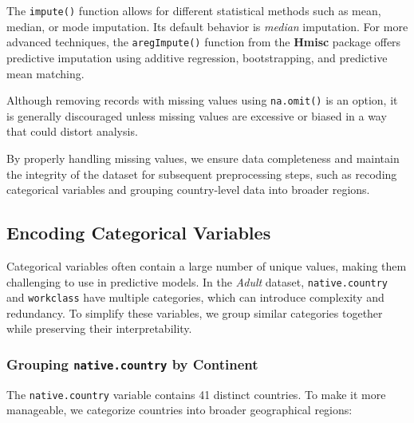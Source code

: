 \documentclass[
  11pt,
]{book}
\theoremstyle{definition}
\theoremstyle{definition}
\theoremstyle{definition}
\theoremstyle{definition}
\theoremstyle{remark}
\begin{document}
The \texttt{impute()} function allows for different statistical methods such as mean, median, or mode imputation. Its default behavior is \emph{median} imputation. For more advanced techniques, the \texttt{aregImpute()} function from the \textbf{Hmisc} package offers predictive imputation using additive regression, bootstrapping, and predictive mean matching.

Although removing records with missing values using \texttt{na.omit()} is an option, it is generally discouraged unless missing values are excessive or biased in a way that could distort analysis.

By properly handling missing values, we ensure data completeness and maintain the integrity of the dataset for subsequent preprocessing steps, such as recoding categorical variables and grouping country-level data into broader regions.

\subsection{Encoding Categorical Variables}\label{encoding-categorical-variables}

Categorical variables often contain a large number of unique values, making them challenging to use in predictive models. In the \emph{Adult} dataset, \texttt{native.country} and \texttt{workclass} have multiple categories, which can introduce complexity and redundancy. To simplify these variables, we group similar categories together while preserving their interpretability.

\subsubsection*{\texorpdfstring{Grouping \texttt{native.country} by Continent}{Grouping native.country by Continent}}\label{grouping-native.country-by-continent}


The \texttt{native.country} variable contains 41 distinct countries. To make it more manageable, we categorize countries into broader geographical regions:
\end{document}
